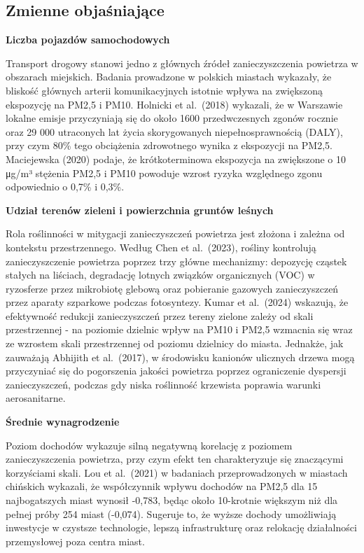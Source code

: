 \documentclass[
  11pt,
]{article}
\begin{document}
\subsection{Zmienne objaśniające}\label{zmienne-objaux15bniajux105ce}

\textbf{Liczba pojazdów samochodowych}

Transport drogowy stanowi jedno z głównych źródeł zanieczyszczenia
powietrza w obszarach miejskich. Badania prowadzone w polskich miastach
wykazały, że bliskość głównych arterii komunikacyjnych istotnie wpływa
na zwiększoną ekspozycję na PM2,5 i PM10. Holnicki et al.~(2018)
wykazali, że w Warszawie lokalne emisje przyczyniają się do około 1600
przedwczesnych zgonów rocznie oraz 29 000 utraconych lat życia
skorygowanych niepełnosprawnością (DALY), przy czym 80\% tego obciążenia
zdrowotnego wynika z ekspozycji na PM2,5. Maciejewska (2020) podaje, że
krótkoterminowa ekspozycja na zwiększone o 10 μg/m³ stężenia PM2,5 i
PM10 powoduje wzrost ryzyka względnego zgonu odpowiednio o 0,7\% i
0,3\%.

\textbf{Udział terenów zieleni i powierzchnia gruntów leśnych}

Rola roślinności w mitygacji zanieczyszczeń powietrza jest złożona i
zależna od kontekstu przestrzennego. Według Chen et al.~(2023), rośliny
kontrolują zanieczyszczenie powietrza poprzez trzy główne mechanizmy:
depozycję cząstek stałych na liściach, degradację lotnych związków
organicznych (VOC) w ryzosferze przez mikrobiotę glebową oraz pobieranie
gazowych zanieczyszczeń przez aparaty szparkowe podczas fotosyntezy.
Kumar et al.~(2024) wskazują, że efektywność redukcji zanieczyszczeń
przez tereny zielone zależy od skali przestrzennej - na poziomie
dzielnic wpływ na PM10 i PM2,5 wzmacnia się wraz ze wzrostem skali
przestrzennej od poziomu dzielnicy do miasta. Jednakże, jak zauważają
Abhijith et al.~(2017), w środowisku kanionów ulicznych drzewa mogą
przyczyniać się do pogorszenia jakości powietrza poprzez ograniczenie
dyspersji zanieczyszczeń, podczas gdy niska roślinność krzewista
poprawia warunki aerosanitarne.

\textbf{Średnie wynagrodzenie}

Poziom dochodów wykazuje silną negatywną korelację z poziomem
zanieczyszczenia powietrza, przy czym efekt ten charakteryzuje się
znaczącymi korzyściami skali. Lou et al.~(2021) w badaniach
przeprowadzonych w miastach chińskich wykazali, że współczynnik wpływu
dochodów na PM2,5 dla 15 najbogatszych miast wynosił -0,783, będąc około
10-krotnie większym niż dla pełnej próby 254 miast (-0,074). Sugeruje
to, że wyższe dochody umożliwiają inwestycje w czystsze technologie,
lepszą infrastrukturę oraz relokację działalności przemysłowej poza
centra miast.
\end{document}
